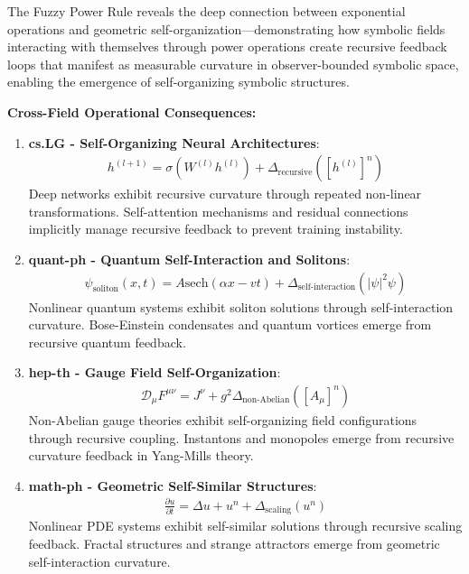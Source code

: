 \begin{scholium}
\label{scholium:bk4_symbolic_self_organization}
The Fuzzy Power Rule reveals the deep connection between exponential operations and geometric self-organization—demonstrating how symbolic fields interacting with themselves through power operations create recursive feedback loops that manifest as measurable curvature in observer-bounded symbolic space, enabling the emergence of self-organizing symbolic structures.

\textbf{Cross-Field Operational Consequences:}

\begin{enumerate}
\item \textbf{cs.LG - Self-Organizing Neural Architectures}: 
   \begin{align}
   h^{(l+1)} = \sigma(W^{(l)} h^{(l)}) + \Delta_{\text{recursive}}([h^{(l)}]^n)
   \end{align}
   Deep networks exhibit recursive curvature through repeated non-linear transformations. Self-attention mechanisms and residual connections implicitly manage recursive feedback to prevent training instability.

\item \textbf{quant-ph - Quantum Self-Interaction and Solitons}:
   \begin{align}
   \psi_{\text{soliton}}(x,t) = A \text{sech}(\alpha x - vt) + \Delta_{\text{self-interaction}}(|\psi|^2\psi)
   \end{align}
   Nonlinear quantum systems exhibit soliton solutions through self-interaction curvature. Bose-Einstein condensates and quantum vortices emerge from recursive quantum feedback.

\item \textbf{hep-th - Gauge Field Self-Organization}:
   \begin{align}
   \mathcal{D}_\mu F^{\mu\nu} = J^\nu + g^2 \Delta_{\text{non-Abelian}}([A_\mu]^n)
   \end{align}
   Non-Abelian gauge theories exhibit self-organizing field configurations through recursive coupling. Instantons and monopoles emerge from recursive curvature feedback in Yang-Mills theory.

\item \textbf{math-ph - Geometric Self-Similar Structures}:
   \begin{align}
   \frac{\partial u}{\partial t} = \Delta u + u^n + \Delta_{\text{scaling}}(u^n)
   \end{align}
   Nonlinear PDE systems exhibit self-similar solutions through recursive scaling feedback. Fractal structures and strange attractors emerge from geometric self-interaction curvature.


\end{enumerate}
\end{scholium}
